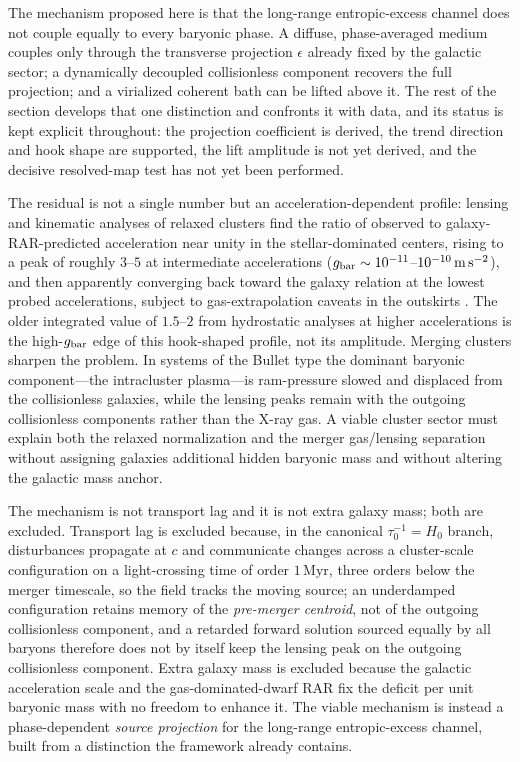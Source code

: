 \documentclass[11pt]{article}
\begin{document}
The mechanism proposed here is that the long-range entropic-excess channel does not couple equally to every baryonic phase. A diffuse, phase-averaged medium couples only through the transverse projection $\epsilon$ already fixed by the galactic sector; a dynamically decoupled collisionless component recovers the full projection; and a virialized coherent bath can be lifted above it. The rest of the section develops that one distinction and confronts it with data, and its status is kept explicit throughout: the projection coefficient is derived, the trend direction and hook shape are supported, the lift amplitude is not yet derived, and the decisive resolved-map test has not yet been performed.

The residual is not a single number but an acceleration-dependent profile: lensing and kinematic analyses of relaxed clusters \citep{Tian2020,Eckert2022,Li2023} find the ratio of observed to galaxy-RAR-predicted acceleration near unity in the stellar-dominated centers, rising to a peak of roughly $3$--$5$ at intermediate accelerations ($g_{\rm bar}\sim10^{-11}$--$10^{-10}\,{\rm m\,s^{-2}}$), and then apparently converging back toward the galaxy relation at the lowest probed accelerations, subject to gas-extrapolation caveats in the outskirts \citep{Li2023}. The older integrated value of $1.5$--$2$ from hydrostatic analyses at higher accelerations is the high-$g_{\rm bar}$ edge of this hook-shaped profile, not its amplitude. Merging clusters sharpen the problem. In systems of the Bullet type the dominant baryonic component---the intracluster plasma---is ram-pressure slowed and displaced from the collisionless galaxies, while the lensing peaks remain with the outgoing collisionless components rather than the X-ray gas. A viable cluster sector must explain both the relaxed normalization and the merger gas/lensing separation without assigning galaxies additional hidden baryonic mass and without altering the galactic mass anchor.

The mechanism is not transport lag and it is not extra galaxy mass; both are excluded. Transport lag is excluded because, in the canonical $\tau_0^{-1}=H_0$ branch, disturbances propagate at $c$ and communicate changes across a cluster-scale configuration on a light-crossing time of order $1\,\mathrm{Myr}$, three orders below the merger timescale, so the field tracks the moving source; an underdamped configuration retains memory of the \emph{pre-merger centroid}, not of the outgoing collisionless component, and a retarded forward solution sourced equally by all baryons therefore does not by itself keep the lensing peak on the outgoing collisionless component. Extra galaxy mass is excluded because the galactic acceleration scale and the gas-dominated-dwarf RAR fix the deficit per unit baryonic mass with no freedom to enhance it. The viable mechanism is instead a phase-dependent \emph{source projection} for the long-range entropic-excess channel, built from a distinction the framework already contains.
\end{document}
